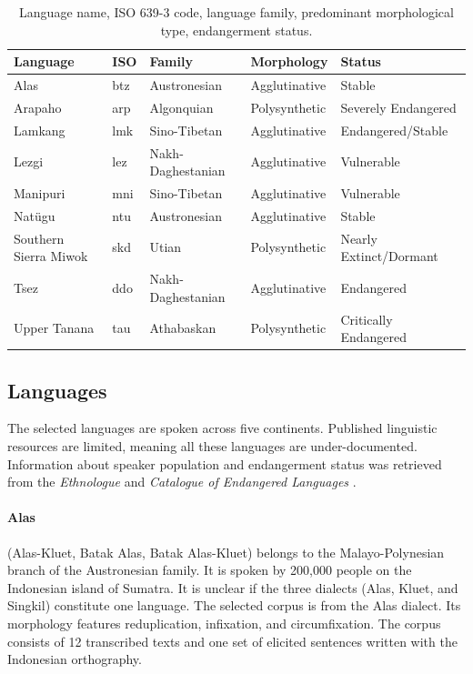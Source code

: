 \bgroup
\def\arraystretch{1.25}
\begin{table}[tb]
    \begin{center}
    \begin{tabular}{lllll} 
    \textbf{Language} & \textbf{ISO} & \textbf{Family} & \textbf{Morphology} & \textbf{Status} \\
    \hline
    Alas & btz & Austronesian & Agglutinative & Stable \\
    Arapaho & arp & Algonquian & Polysynthetic & Severely Endangered  \\
    Lamkang & lmk & Sino-Tibetan & Agglutinative & Endangered/Stable   \\
    Lezgi & lez & Nakh-Daghestanian & Agglutinative & Vulnerable \\
    Manipuri & mni & Sino-Tibetan & Agglutinative & Vulnerable \\
    Natügu & ntu & Austronesian & Agglutinative & Stable \\
    Southern Sierra Miwok & skd & Utian & Polysynthetic & Nearly Extinct/Dormant \\ 
    Tsez & ddo & Nakh-Daghestanian & Agglutinative & Endangered \\
    Upper Tanana & tau & Athabaskan & Polysynthetic & Critically Endangered \\
	\end{tabular}
	\caption[Data]{Language name, ISO 639-3 code, language family, predominant morphological type, endangerment status.}
	\label{tab:langs}
\end{center}
\end{table}


\subsection{Languages} 

The selected languages are spoken across five continents.
Published linguistic resources are limited, meaning all these languages are under-documented. Information about speaker population and endangerment status was retrieved from the \emph{Ethnologue} \citep{eberhard_ethnologue:2020} and \emph{Catalogue of Endangered Languages} \citep{elcat_2020}.

\paragraph{Alas}
(Alas-Kluet, Batak Alas, Batak Alas-Kluet) belongs to the Malayo-Polynesian branch of the Austronesian family. It is spoken by 200,000 people on the Indonesian island of Sumatra. It is unclear if the three dialects (Alas, Kluet, and Singkil) constitute one language. The selected corpus is from the Alas dialect.  Its morphology features reduplication, infixation, and circumfixation. The corpus consists of 12 transcribed texts and one set of elicited sentences written with the Indonesian orthography. 

